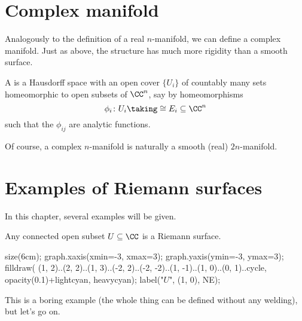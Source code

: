 \section{Complex manifold}
Analogously to the definition of a real $n$-manifold, we can define a complex manifold.
Just as above, the structure has much more rigidity than a smooth surface.

\begin{definition}
	A  is a Hausdorff space with an open cover $\{ U_i \}$ of countably
	many sets homeomorphic to open subsets of $\CC^n$, say by homeomorphisms
	\[ \phi_i \colon U_i \taking\cong E_i \subseteq \CC^n \]
	such that the  $\phi_{ij}$ are analytic functions.
\end{definition}
Of course, a complex $n$-manifold is naturally a smooth (real) $2n$-manifold.

\section{Examples of Riemann surfaces}

In this chapter, several examples will be given.
\begin{example}
	Any connected open subset $U \subseteq \CC$ is a Riemann surface.
	\begin{center}
		\begin{asy}
			size(6cm);
			graph.xaxis(xmin=-3, xmax=3);
			graph.yaxis(ymin=-3, ymax=3);
			filldraw(
				(1, 2)..(2, 2)..(1, 3)..(-2, 2)..(-2, -2)..(1, -1)..(1, 0)..(0, 1)..cycle,
				opacity(0.1)+lightcyan, heavycyan);
			label("$U$", (1, 0), NE);
		\end{asy}
	\end{center}

	This is a boring example (the whole thing can be defined without any welding), but let's go on.
\end{example}

